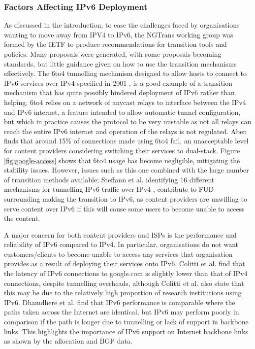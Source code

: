 \subsubsection{Factors Affecting IPv6 Deployment}

As discussed in the introduction, to ease the challenges faced by organisations
wanting to move away from IPV4 to IPv6, the NGTrans working group was formed by
the IETF to produce recommendations for transition tools and policies. Many
proposals were generated, with some proposals becoming standards, but little
guidance given on how to use the transition mechanisms effectively. The 6to4
tunnelling mechanism designed to allow hosts to connect to IPv6 services over
IPv4 specified in 2001 \cite{rfc3056}, is a good example of a transition mechanism that
has quite possibly hindered deployment of IPv6 rather than helping. 6to4 relies
on a network of anycast relays to interface between the IPv4 and IPv6 internet,
a feature intended to allow automatic tunnel configuration, but which in
practice causes the protocol to be very unstable as not all relays can reach the
entire IPv6 internet and operation of the relays is not regulated. Aben finds
that around 15\% of connections made using 6to4 fail\cite{aben_6to4_2011}, an unacceptable
level for content providers considering switching their services to dual-stack.
Figure \ref{fig:google-access} shows that 6to4 usage has become negligible,
mitigating the stability issues. However, issues such as this one combined with
the large number of transition methods available; Steffann et al.
identifying 16 different mechanisms for tunnelling IPv6 traffic over IPv4
\cite{draft-steffann-tunnels},
contribute to FUD surrounding making the transition to IPv6, as content
providers are unwilling to serve content over IPv6 if this will cause some users
to become unable to access the content.

A major concern for both content providers and ISPs is the performance and
reliability of IPv6 compared to IPv4. In particular, organisations do not want
customers/clients to become unable to access any services that organisation
provides as a result of deploying their services onto IPv6. Colitti et al. find
that the latency of IPv6 connections to google.com is slightly lower than that
of IPv4 connections, despite tunnelling overheads, although Colitti et al. also
state that this may be due to the relatively high proportion of research
institutions using IPv6. Dhamdhere et al. find that IPv6 performance is
comparable where the paths taken across the Internet are identical, but IPv6 may
perform poorly in comparison if the path is longer due to tunnelling or lack of support in
backbone links. This highlights the importance of IPv6 support on Internet
backbone links as shown by the allocation and BGP data.

